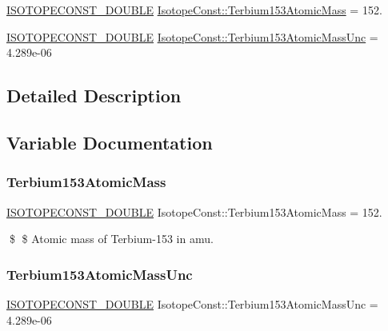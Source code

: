 \begin{DoxyCompactItemize}
\item 
\mbox{\hyperlink{group___isotope_const-_macros_ga8f45a7272ce02c0b4c65c44636ed719a}{I\+S\+O\+T\+O\+P\+E\+C\+O\+N\+S\+T\+\_\+\+D\+O\+U\+B\+LE}} \mbox{\hyperlink{group___isotope_const-_terbium-_tb153_gaf90a6330f63873b3142584a854014a7c}{Isotope\+Const\+::\+Terbium153\+Atomic\+Mass}} = 152.
\item 
\mbox{\hyperlink{group___isotope_const-_macros_ga8f45a7272ce02c0b4c65c44636ed719a}{I\+S\+O\+T\+O\+P\+E\+C\+O\+N\+S\+T\+\_\+\+D\+O\+U\+B\+LE}} \mbox{\hyperlink{group___isotope_const-_terbium-_tb153_ga541e53974e14c052e864a6db9007502f}{Isotope\+Const\+::\+Terbium153\+Atomic\+Mass\+Unc}} = 4.\+289e-\/06
\end{DoxyCompactItemize}


\subsection{Detailed Description}


\subsection{Variable Documentation}
\mbox{\label{group___isotope_const-_terbium-_tb153_gaf90a6330f63873b3142584a854014a7c}} 
\subsubsection{\texorpdfstring{Terbium153\+Atomic\+Mass}{Terbium153AtomicMass}}
{\footnotesize\ttfamily \mbox{\hyperlink{group___isotope_const-_macros_ga8f45a7272ce02c0b4c65c44636ed719a}{I\+S\+O\+T\+O\+P\+E\+C\+O\+N\+S\+T\+\_\+\+D\+O\+U\+B\+LE}} Isotope\+Const\+::\+Terbium153\+Atomic\+Mass = 152.}

\$ \$ Atomic mass of Terbium-\/153 in amu. \mbox{\label{group___isotope_const-_terbium-_tb153_ga541e53974e14c052e864a6db9007502f}} 
\subsubsection{\texorpdfstring{Terbium153\+Atomic\+Mass\+Unc}{Terbium153AtomicMassUnc}}
{\footnotesize\ttfamily \mbox{\hyperlink{group___isotope_const-_macros_ga8f45a7272ce02c0b4c65c44636ed719a}{I\+S\+O\+T\+O\+P\+E\+C\+O\+N\+S\+T\+\_\+\+D\+O\+U\+B\+LE}} Isotope\+Const\+::\+Terbium153\+Atomic\+Mass\+Unc = 4.\+289e-\/06}

